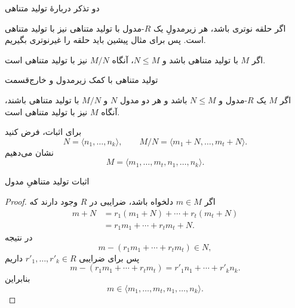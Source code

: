 \begin{frame}[t]{دو تذکر دربارهٔ تولید متناهی}
    \label{lec09:finite-generation-remarks}
    \begin{remark}
        اگر حلقه نوتری باشد، هر زیرمدولِ یک $R$-مدول با تولید متناهی نیز
        با تولید متناهی است. پس برای مثال پیشین باید حلقه را غیرنوتری بگیریم.
    \end{remark}
    \begin{remark}
        اگر $M$ با تولید متناهی باشد و $N\leqslant M$، آنگاه $M/N$ نیز
        با تولید متناهی است.
    \end{remark}
\end{frame}

\begin{frame}[t]{تولید متناهی با کمک زیرمدول و خارج‌قسمت}
    \label{lec09:finite-generation-extension}
    \begin{theorem}
        اگر $M$ یک $R$-مدول و $N\leqslant M$ باشد و هر دو مدول $N$ و $M/N$
        با تولید متناهی باشند، آنگاه $M$ نیز با تولید متناهی است.
    \end{theorem}
    برای اثبات، فرض کنید
    \[
        N=\langle n_1,\ldots,n_k\rangle,
        \qquad
        M/N=\langle m_1+N,\ldots,m_t+N\rangle.
    \]
    نشان می‌دهیم
    \[
        M=\langle m_1,\ldots,m_t,n_1,\ldots,n_k\rangle.
    \]
\end{frame}

\begin{frame}[t]{اثبات تولید متناهیِ مدول}
    \label{lec09:finite-generation-extension-proof}
    \begin{proof}
        اگر $m\in M$ دلخواه باشد، ضرایبی در $R$ وجود دارند که
        \[
            \begin{aligned}
                m+N
                &=r_1(m_1+N)+\cdots+r_t(m_t+N)\\
                &=r_1m_1+\cdots+r_tm_t+N.
            \end{aligned}
        \]
        در نتیجه
        \[
            m-(r_1m_1+\cdots+r_tm_t)\in N,
        \]
        پس برای ضرایبی $r'_1,\ldots,r'_k\in R$ داریم
        \[
            m-(r_1m_1+\cdots+r_tm_t)=r'_1n_1+\cdots+r'_kn_k.
        \]
        بنابراین
        \[
            m\in\langle m_1,\ldots,m_t,n_1,\ldots,n_k\rangle.
        \]
    \end{proof}
\end{frame}

